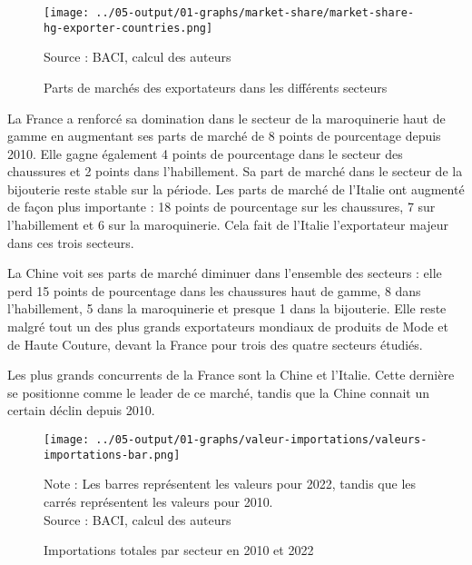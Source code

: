 \documentclass[french,10pt,a4paper]{article}
\begin{document}
\begin{figure}[!h]
  \centering
  \texttt{[image: ../05-output/01-graphs/market-share/market-share-hg-exporter-countries.png]}
  \captionsetup{justification=raggedright,singlelinecheck=false, font=small}
  \caption*{Source : BACI, calcul des auteurs}
  \captionsetup{justification=centering, singlelinecheck=true, font=normalsize}
  \caption{Parts de marchés des exportateurs dans les différents secteurs}
  \label{fig:market-share}
\end{figure}

\bigskip

La France a renforcé sa domination dans le secteur de la maroquinerie haut de gamme en augmentant ses parts de marché de 8 points de pourcentage depuis 2010. Elle gagne également 4 points de pourcentage dans le secteur des chaussures et 2 points dans l'habillement. Sa part de marché dans le secteur de la bijouterie reste stable sur la période. Les parts de marché de l'Italie ont augmenté de façon plus importante : 18 points de pourcentage sur les chaussures, 7 sur l'habillement et 6 sur la maroquinerie. Cela fait de l'Italie l'exportateur majeur dans ces trois secteurs.

La Chine voit ses parts de marché diminuer dans l'ensemble des secteurs : elle perd 15 points de pourcentage dans les chaussures haut de gamme, 8 dans l'habillement, 5 dans la maroquinerie et presque 1 dans la bijouterie. Elle reste malgré tout un des plus grands exportateurs mondiaux de produits de Mode et de Haute Couture, devant la France pour trois des quatre secteurs étudiés.

Les plus grands concurrents de la France sont la Chine et l'Italie. Cette dernière se positionne comme le leader de ce marché, tandis que la Chine connait un certain déclin depuis 2010.

\bigskip

\begin{figure}[!h]
  \centering
  \texttt{[image: ../05-output/01-graphs/valeur-importations/valeurs-importations-bar.png]}
  \captionsetup{justification=raggedright,singlelinecheck=false, font=small}
  \caption*{Note : Les barres représentent les valeurs pour 2022, tandis que les carrés représentent les valeurs pour 2010. \\
  Source : BACI, calcul des auteurs}
  \captionsetup{justification=centering, singlelinecheck=true, font=normalsize}
  \caption{Importations totales par secteur en 2010 et 2022}
  \label{fig:valeurs-importations}
\end{figure}
\end{document}
